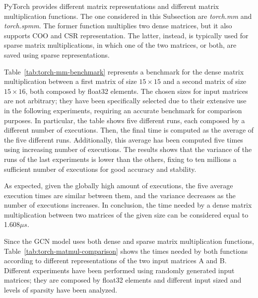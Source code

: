 PyTorch provides different matrix representations and different matrix multiplication functions.
The one considered in this Subsection are \textit{torch.mm} and \textit{torch.spmm}.
The former function multiplies two dense matrices, but it also supports COO and CSR representation.
The latter, instead, is typically used for sparse matrix multiplications, in which one of the two matrices, or both, are saved using sparse representations.

Table~\ref{tab:torch-mm-benchmark} represents a benchmark for the dense matrix multiplication between a first matrix of size $15 \times 15$ and a second matrix of size $15 \times 16$, both composed by float32 elements.
The chosen sizes for input matrices are not arbitrary; they have been specifically selected due to their extensive use in the following experiments, requiring an accurate benchmark for comparison purposes.
In particular, the table shows five different runs, each composed by a different number of executions.
Then, the final time is computed as the average of the five different runs.
Additionally, this average has been computed five times using increasing number of executions.
The results shows that the variance of the runs of the last experiments is lower than the others, fixing to ten millions a sufficient number of executions for good accuracy and stability.

As expected, given the globally high amount of executions, the five average execution times are similar between them, and the variance decreases as the number of executions increases.
In conclusion, the time needed by a dense matrix multiplication between two matrices of the given size can be considered equal to 1.608$\mu s$.

Since the GCN model uses both dense and sparse matrix multiplication functions, Table~\ref{tab:torch-matmul-comparison} shows the times needed by both functions according to different representations of the two input matrices A and B\@.
Different experiments have been performed using randomly generated input matrices; they are composed by float32 elements and different input sized and levels of sparsity have been analyzed.


